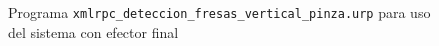    \begin{figure}[H]
      \begin{center}
        \subcapcentertrue
        \hspace{1mm}
      \end{center}
      \caption{Programa \texttt{xmlrpc\_deteccion\_fresas\_vertical\_pinza.urp} para uso del sistema con efector final}
      \label{fig:Programa_UR_pinza}
   \end{figure}
   
